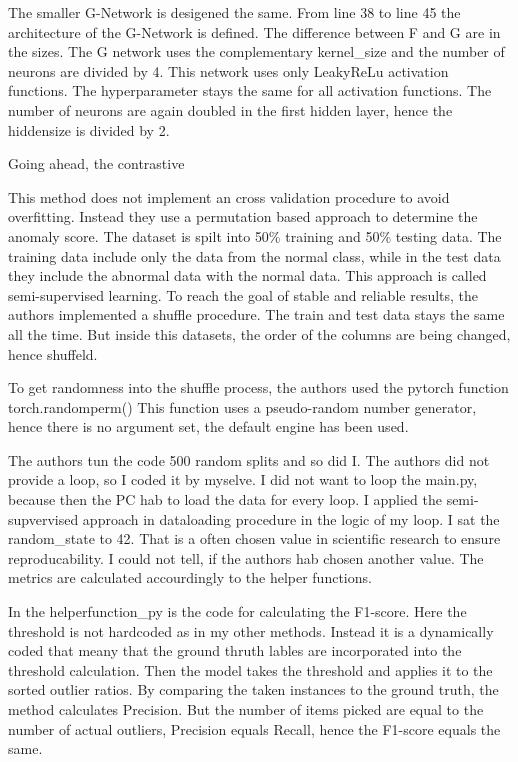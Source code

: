 The smaller G-Network is desigened the same.
From line 38 to line 45 the architecture of the G-Network is defined.
The difference between F and G are in the sizes.
The G network uses the complementary kernel\_size and the number of neurons are divided by 4. 
This network uses only LeakyReLu activation functions.
The hyperparameter stays the same for all activation functions.
The number of neurons are again doubled in the first hidden layer, hence the hiddensize is divided by 2.

Going ahead, the contrastive 


This method does not implement an cross validation procedure to avoid overfitting. 
Instead they use a permutation based approach to determine the anomaly score.
The dataset is spilt into 50\% training and 50\% testing data.
The training data include only the data from the normal class, while in the test data they include the abnormal data with the normal data. 
This approach is called semi-supervised learning.
To reach the goal of stable and reliable results, the authors implemented a shuffle procedure.
The train and test data stays the same all the time.
But inside this datasets, the order of the columns are being changed, hence shuffeld.

To get randomness into the shuffle process, the authors used the pytorch function torch.randomperm()
This function uses a pseudo-random number generator, hence there is no argument set, the default engine has been used.

The authors tun the code 500 random splits and so did I.
The authors did not provide a loop, so I coded it by myselve.
I did not want to loop the main.py, because then the PC hab to load the data for every loop. 
I applied the semi-supvervised approach in dataloading procedure in the logic of my loop.
I sat the random\_state to 42.
That is a often chosen value in scientific research to ensure reproducability.
I could not tell, if the authors hab chosen another value.  
The metrics are calculated accourdingly to the helper functions.


In the helperfunction\_py is the code for calculating the F1-score.
Here the threshold is not hardcoded as in my other methods.
Instead it is a dynamically coded that meany that the ground thruth lables are incorporated into the threshold calculation.
Then the model takes the threshold and applies it to the sorted outlier ratios.
By comparing the taken instances to the ground truth, the method calculates Precision.
But the number of items picked are equal to the number of actual outliers, Precision equals Recall, hence the F1-score equals the same. 


